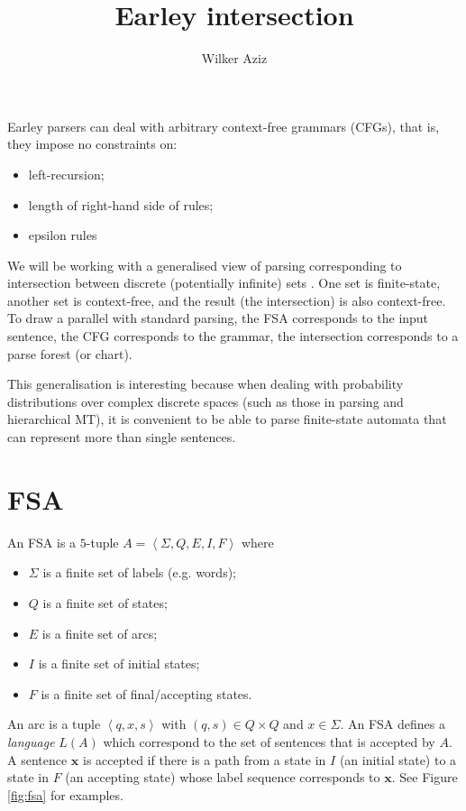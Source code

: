 \documentclass[11pt]{article}
\title{Earley intersection}
\author{Wilker Aziz}
\newcommand{\angbrack}[1]{\ensuremath{\left\langle #1 \right\rangle}}
\begin{document}
\maketitle


Earley parsers \citep{Earley:1970} can deal with arbitrary context-free grammars (CFGs), that is, they impose no constraints on:
\begin{itemize}
	\item left-recursion;
	\item length of right-hand side of rules;
	\item epsilon rules
\end{itemize}

We will be working with a generalised view of parsing corresponding to intersection between discrete (potentially infinite) sets \citep{BarHillel+1961,Billott+1989}. One set is finite-state, another set is context-free, and the result (the intersection) is also context-free. 
To draw a parallel with standard parsing, the FSA corresponds to the input sentence, the CFG corresponds to the grammar, the intersection corresponds to a parse forest (or chart).

This generalisation is interesting because when dealing with probability distributions over complex discrete spaces (such as those in parsing and hierarchical MT), it is convenient to be able to parse finite-state automata that can represent more than single sentences.

\section{FSA} 

An FSA is a $5$-tuple $A = \angbrack{\Sigma, Q, E, I, F}$ where
\begin{itemize}
	\item $\Sigma$ is a finite set of labels (e.g. words);
	\item $Q$ is a finite set of states;
	\item $E$ is a finite set of arcs;
	\item $I$ is a finite set of initial states;
	\item $F$ is a finite set of final/accepting states.
\end{itemize}
An arc is a tuple $\angbrack{q, x, s}$ with $(q, s) \in Q \times Q$ and $x \in \Sigma$.
An FSA defines a \emph{language} $L(A)$ which correspond to the set of sentences that is accepted by $A$.
A sentence $\mathbf x$ is accepted if there is a path from a state in $I$ (an initial state) to a state in $F$ (an accepting state) whose label sequence corresponds to $\mathbf x$. See Figure \ref{fig:fsa} for examples.
\end{document}

